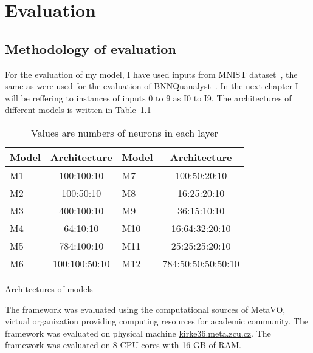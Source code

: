 \documentclass[
    digital,
    color,
    oneside,
    sansbold,
    lot,
    nolof
]{fithesis}
\begin{document}


\chapter{Evaluation}

\section{Methodology of evaluation}

For the evaluation of my model, I have used inputs from MNIST dataset~\cite{mnist2017},
the same as were used for the evaluation of BNNQuanalyst~\cite{10.1145/3563212}.
In the next chapter I will be reffering to instances of inputs
0 to 9 as I0 to I9.
The architectures of different models is written in Table~\ref{table:model_architecture}

\begin{table}
\begin{tabular}{l c | l c}  %
    \toprule{}%
    Model & Architecture  & Model & Architecture       \\ \midrule
    M1    & 100:100:10    & M7    & 100:50:20:10       \\
    M2    & 100:50:10     & M8    & 16:25:20:10        \\
    M3    & 400:100:10    & M9    & 36:15:10:10        \\
    M4    & 64:10:10      & M10   & 16:64:32:20:10     \\
    M5    & 784:100:10    & M11   & 25:25:25:20:10     \\
    M6    & 100:100:50:10 & M12   & 784:50:50:50:50:10 \\ \bottomrule
\end{tabular}
\caption{Architectures of models}%
    \caption*{Values are numbers of neurons in each layer}%
    \label{table:model_architecture}
\end{table}


The framework was evaluated using the computational sources of MetaVO,
virtual organization providing computing resources for academic community.
The framework was evaluated on physical machine
\href{https://metavo.metacentrum.cz/pbsmon2/machine/kirke36.meta.zcu.cz}{kirke36.meta.zcu.cz}.
The framework was evaluated on 8 CPU cores with 16 GB of RAM. %
\end{document}
